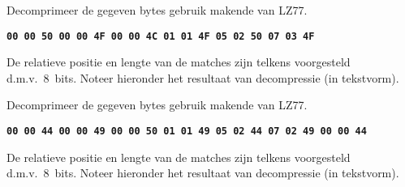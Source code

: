 \documentclass[]{pvm-exam}
\newcommand{\hex}[1]{\texttt{\bfseries #1}}
\begin{document}
\begin{question}
  Decomprimeer de gegeven bytes gebruik makende van LZ77.
  \begin{center}
    \hex{00 00 50 00 00 4F 00 00 4C 01 01 4F 05 02 50 07 03 4F}
  \end{center}
  De relatieve positie en lengte van de matches zijn telkens voorgesteld d.m.v.~8~bits.
  Noteer hieronder het resultaat van decompressie (in tekstvorm).
  \vskip5mm
  \begin{center}
  \end{center}
\end{question}

\begin{question}
  Decomprimeer de gegeven bytes gebruik makende van LZ77.
  \begin{center}
    \hex{00 00 44 00 00 49 00 00 50 01 01 49 05 02 44 07 02 49 00 00 44}
  \end{center}
  De relatieve positie en lengte van de matches zijn telkens voorgesteld d.m.v.~8~bits.
  Noteer hieronder het resultaat van decompressie (in tekstvorm).
  \vskip5mm
  \begin{center}
  \end{center}
\end{question}
\end{document}
